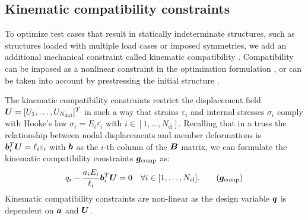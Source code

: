 \subsection{Kinematic compatibility constraints}
To optimize test cases that result in statically indeterminate structures, such as structures loaded with multiple load cases or imposed symmetries, we add an additional mechanical constraint called kinematic compatibility . Compatibility can be imposed as a nonlinear constraint in the optimization formulation , or can be taken into account by prestressing the initial structure .

The kinematic compatibility constraints restrict the displacement field $\bm{U} = [U_1, \ldots,U_{N_{\text{dof}}}]^T$ in such a way that strains $\varepsilon_i$ and internal stresses $\sigma_i$ comply with Hooke's law $\sigma_i = E_i \varepsilon_i$ with $i \in [1,\ldots, N_{\text{el}}]$. Recalling that in a truss the relationship between nodal displacements and member deformations is $\bm{b}^T_i \bm{U} = \ell_i \varepsilon_i$ with $\bm{b}$ as the $i$-th column of the $\bm{B}$ matrix, we can formulate the kinematic compatibility constraints $\bm{g}_{\textrm{comp}}$ as:
\begin{equation}
\label{eq:04_compatib}
     q_i - \frac{a_i E_i}{\ell_i} \vect{b}_i^T\vect{U}  = 0  \quad \forall i \in [1,\ldots, N_{\text{el}}].
     \tag{$\vect{g}_{\textrm{comp}}$}
\end{equation}
Kinematic compatibility constraints are non-linear as the design variable $\bm{q}$ is dependent on $\bm{a}$ and $\bm{U}$.


